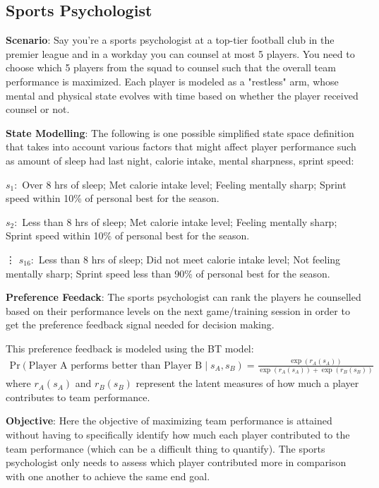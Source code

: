 \documentclass{article} %
\begin{document}
{\subsection{Sports Psychologist}

\textbf{Scenario}: Say you're a sports psychologist at a top-tier football club in the premier league and in a workday you can counsel at most 5 players. You need to choose which 5 players from the squad to counsel such that the overall team performance is maximized. Each  player is modeled as a "restless" arm, whose mental and physical state evolves with time based on whether the player received counsel or not.  


\textbf{State Modelling}: The following is one possible simplified state space definition that takes into account various factors that might affect player performance such as amount of sleep had last night, calorie intake, mental sharpness, sprint speed:

$
s_1:$ Over 8 hrs of sleep; Met calorie intake level; Feeling mentally sharp; Sprint speed within 10\% of personal best for the season.

$
s_2:$ Less than 8 hrs of sleep; Met calorie intake level; Feeling mentally sharp; Sprint speed within 10\% of personal best for the season.

\vdots
$
s_{16}:$ Less than 8 hrs of sleep; Did not meet calorie intake level; Not feeling mentally sharp; Sprint speed less than 90\% of personal best for the season.

\textbf{Preference Feedack}:  The sports psychologist can rank the players he counselled based on their performance levels on the next game/training session  in order to get the preference feedback signal needed for decision making.

This preference feedback is modeled using the BT model:
\begin{align*}
   \text{Pr}(\text{Player A performs better than Player B} \mid s_A, s_B) = \frac{\exp(r_A(s_A))}{\exp(r_A(s_A)) + \exp(r_B(s_B))}
\end{align*}
where $r_A(s_A)$ and $r_B(s_B)$ represent the latent measures of how much a player contributes to team performance.

\textbf{Objective}: Here the  objective  of maximizing team performance is attained without having to specifically identify how much each player contributed to the team performance (which can be a difficult thing to quantify). The sports psychologist only needs to assess which player contributed more in comparison with one another to achieve the same end goal.






}
\end{document}
